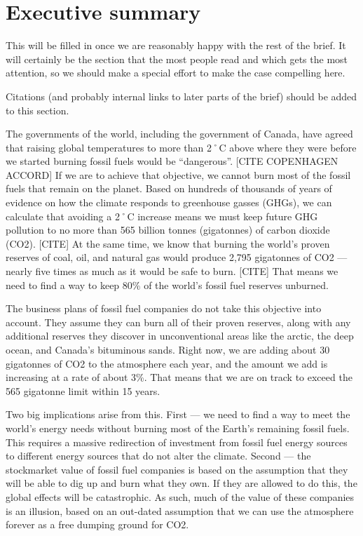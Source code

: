
		\section{Executive summary}

\begin{vcom}
This will be filled in once we are reasonably happy with the rest of the brief. It will certainly be the section that the most people read and which gets the most attention, so we should make a special effort to make the case compelling here.
\end{vcom}


\begin{vcom}
	Citations (and probably internal links to later parts of the brief) should be added to this section.
\end{vcom}


The governments of the world, including the government of Canada, have agreed that raising global temperatures to more than 2˚C above where they were before we started burning fossil fuels would be ``dangerous''. [CITE COPENHAGEN ACCORD]
If we are to achieve that objective, we cannot burn most of the fossil fuels that remain on the planet.
Based on hundreds of thousands of years of evidence on how the climate responds to greenhouse gasses (GHGs), we can calculate that avoiding a 2˚C increase means we must keep future GHG pollution to no more than 565 billion tonnes (gigatonnes) of carbon dioxide (CO2). [CITE]
At the same time, we know that burning the world's proven reserves of coal, oil, and natural gas would produce 2,795 gigatonnes of CO2 --- nearly five times as much as it would be safe to burn. [CITE]
That means we need to find a way to keep 80\% of the world's fossil fuel reserves unburned.



The business plans of fossil fuel companies do not take this objective into account.
They assume they can burn all of their proven reserves, along with any additional reserves they discover in unconventional areas like the arctic, the deep ocean, and Canada's bituminous sands.
Right now, we are adding about 30 gigatonnes of CO2 to the atmosphere each year, and the amount we add is increasing at a rate of about 3\%.
That means that we are on track to exceed the 565 gigatonne limit within 15 years.



Two big implications arise from this. First --- we need to find a way to meet the world's energy needs without burning most of the Earth's remaining fossil fuels. 
This requires a massive redirection of investment from fossil fuel energy sources to different energy sources that do not alter the climate.
Second --- the stockmarket value of fossil fuel companies is based on the assumption that they will be able to dig up and burn what they own.
If they are allowed to do this, the global effects will be catastrophic.
As such, much of the value of these companies is an illusion, based on an out-dated assumption that we can use the atmosphere forever as a free dumping ground for CO2.



